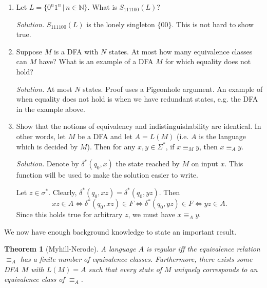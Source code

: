 \documentclass[11pt]{article}
\newtheorem{thm}{Theorem}[section]
\newcounter{enum}
\newcommand{\solution}
{
\vspace{5pt}
\noindent\textit{Solution.}\qquad
}
\begin{document}
\begin{enumerate}

\item Let $L=\{0^n1^n\,|\, n\in\mathbb{N}\}$.  What is $S_{111100}(L)$?

\solution $S_{111100}(L)$ is the lonely singleton $\{00\}$.  This is not hard to show true.

\item Suppose $M$ is a DFA with $N$ states.  At most how many equivalence classes can $M$ have?  What is an example of a DFA $M$ for which equality does not hold?

\solution At most $N$ states.  Proof uses a Pigeonhole argument.  An example of when equality does not hold is when we have redundant states, e.g. the DFA in the example above.

\item Show that the notions of equivalency and indistinguishability are identical.  In other words, let $M$ be a DFA and let $A=L(M)$ (i.e. $A$ is the language which is decided by $M$).  Then for any $x,y\in\Sigma^*$, if $x\equiv_M y$, then $x\equiv_A y$.

\solution Denote by $\delta^*(q_0,x)$ the state reached by $M$ on input $x$.  This function will be used to make the solution easier to write.

\par Let $z\in\sigma^*$.  Clearly, $\delta^*(q_0,xz) = \delta^*(q_0,yz)$.  Then \[xz\in A \iff \delta^*(q_0,xz)\in F\iff \delta^*(q_0,yz)\in F\iff yz\in A.\] Since this holds true for arbitrary $z$, we must have $x\equiv_A y$.

\end{enumerate}

We now have enough background knowledge to state an important result.

\begin{thm}[Myhill-Nerode]A language $A$ is regular iff the equivalence relation $\equiv_A$ has a finite number of equivalence classes.  Furthermore, there exists some DFA $M$ with $L(M)=A$ such that every state of $M$ uniquely corresponds to an equivalence class of $\equiv_A$.
\end{thm}
\end{document}
